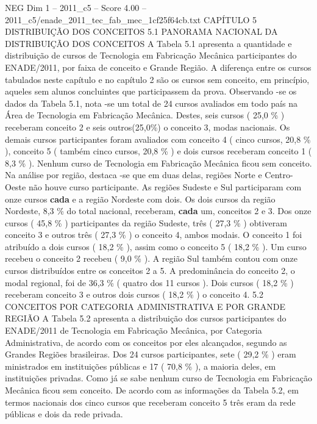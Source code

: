 \begin{textsample}{NEG Dim 1 – 2011\_c5 – Score 4.00 – 2011\_c5/enade\_2011\_tec\_fab\_mec\_1cf25f64cb.txt}  \label{ex:f1_neg_317}
CAPÍTULO 5 DISTRIBUIÇÃO DOS CONCEITOS 5.1 PANORAMA NACIONAL DA DISTRIBUIÇÃO DOS CONCEITOS A Tabela 5.1 apresenta a quantidade e distribuição de cursos de Tecnologia em Fabricação Mecânica participantes do ENADE/2011, por faixa de conceito e Grande Região.
A diferença entre os cursos tabulados neste capítulo e no capítulo 2 são os cursos sem conceito, em princípio, aqueles sem alunos concluintes que participassem da prova.
Observando -se os dados da Tabela 5.1, nota -se um total de 24 cursos avaliados em todo país na Área de Tecnologia em Fabricação Mecânica.
Destes, seis cursos ( 25,0 \% ) receberam conceito 2 e seis outros(25,0\%) o conceito 3, modas nacionais.
Os demais cursos participantes foram avaliados com conceito 4 ( cinco cursos, 20,8 \% ), conceito 5 ( também cinco cursos, 20,8 \% ) e dois cursos receberam conceito 1 ( 8,3 \% ).
Nenhum curso de Tecnologia em Fabricação Mecânica ficou sem conceito.
Na análise por região, destaca -se que em duas delas, regiões Norte e Centro-Oeste não houve curso participante.
As regiões Sudeste e Sul participaram com onze cursos \textbf{cada} e a região Nordeste com dois.
Os dois cursos da região Nordeste, 8,3 \% do total nacional, receberam, \textbf{cada} um, conceitos 2 e 3.
Dos onze cursos ( 45,8 \% ) participantes da região Sudeste, três ( 27,3 \% ) obtiveram conceito 3 e outros três ( 27,3 \% ) o conceito 4, ambos modais.
O conceito 1 foi atribuído a dois cursos ( 18,2 \% ), assim como o conceito 5 ( 18,2 \% ).
Um curso recebeu o conceito 2 recebeu ( 9,0 \% ).
A região Sul também contou com onze cursos distribuídos entre os conceitos 2 a 5.
A predominância do conceito 2, o modal regional, foi de 36,3 \% ( quatro dos 11 cursos ).
Dois cursos ( 18,2 \% ) receberam conceito 3 e outros dois cursos ( 18,2 \% ) o conceito 4. 5.2 CONCEITOS POR CATEGORIA ADMINISTRATIVA E POR GRANDE REGIÃO A Tabela 5.2 apresenta a distribuição dos cursos participantes do ENADE/2011 de Tecnologia em Fabricação Mecânica, por Categoria Administrativa, de acordo com os conceitos por eles alcançados, segundo as Grandes Regiões brasileiras.
Dos 24 cursos participantes, sete ( 29,2 \% ) eram ministrados em instituições públicas e 17 ( 70,8 \% ), a maioria deles, em instituições privadas.
Como já se sabe nenhum curso de Tecnologia em Fabricação Mecânica ficou sem conceito.
De acordo com as informações da Tabela 5.2, em termos nacionais dos cinco cursos que receberam conceito 5 três eram da rede públicas e dois da rede privada.

\end{textsample}
